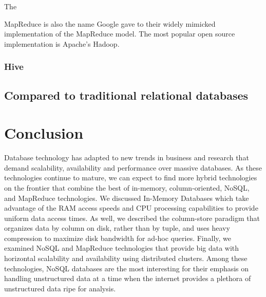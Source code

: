 \documentclass[11pt,a4paper]{report}
\begin{document}
The 

MapReduce is also the name Google gave to their widely mimicked implementation of the MapReduce model. The most popular open source implementation is Apache's Hadoop. 
\subsubsection*{Hive}

\subsection*{Compared to traditional relational databases}


\section{Conclusion}
Database technology has adapted to new trends in business and research that demand scalability, availability and performance over massive databases. As these technologies continue to mature, we can expect to find more hybrid technologies on the frontier that combine the best of in-memory, column-oriented, NoSQL, and MapReduce technologies. We discussed In-Memory Databases which take advantage of the RAM access speeds and CPU processing capabilities to provide uniform data access times. As well, we described the column-store paradigm that organizes data by column on disk, rather than by tuple, and uses heavy compression to maximize disk bandwidth for ad-hoc queries. Finally, we examined NoSQL and MapReduce technologies that provide big data with horizontal scalability and availability using distributed clusters. Among these technologies, NoSQL databases are the most interesting for their emphasis on handling unstructured data at a time when the internet provides a plethora of unstructured data ripe for analysis.
\pagebreak


\end{document}
